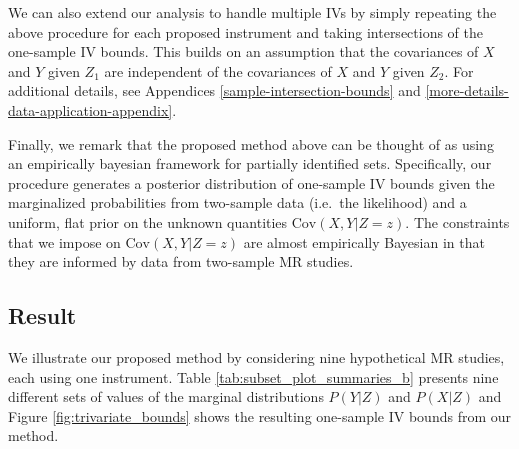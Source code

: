\documentclass[
]{article}
\theoremstyle{plain}
\begin{document}
We can also extend our analysis to handle multiple IVs by simply repeating the above procedure for each proposed instrument and taking intersections of the one-sample IV bounds. This builds on an assumption that the covariances of \(X\) and \(Y\) given \(Z_1\) are independent of the covariances of \(X\) and \(Y\) given \(Z_2\). For additional details, see Appendices \ref{sample-intersection-bounds} and \ref{more-details-data-application-appendix}.

Finally, we remark that the proposed method above can be thought of as using an empirically bayesian framework for partially identified sets. Specifically, our procedure generates a posterior distribution of one-sample IV bounds given the marginalized probabilities from two-sample data (i.e.~the likelihood) and a uniform, flat prior on the unknown quantities \(\text{Cov}(X, Y | Z = z)\). The constraints that we impose on \(\text{Cov}(X, Y | Z = z)\) are almost empirically Bayesian in that they are informed by data from two-sample MR studies.

\hypertarget{result}{%
\subsection{Result}\label{result}}

We illustrate our proposed method by considering nine hypothetical MR studies, each using one instrument. Table \ref{tab:subset_plot_summaries_b} presents nine different sets of values of the marginal distributions \(P(Y | Z)\) and \(P(X | Z)\) and Figure \ref{fig:trivariate_bounds} shows the resulting one-sample IV bounds from our method.
\end{document}
